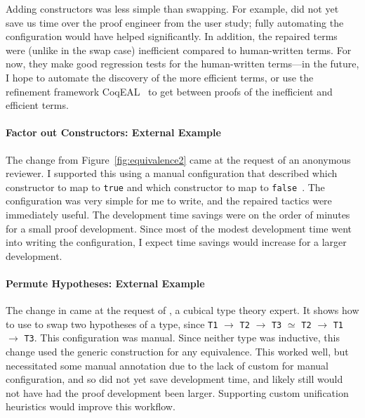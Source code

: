 Adding constructors was less simple than swapping.
For example, \toolnamec did not yet save us time over the proof engineer from the user study;
fully automating the configuration would have helped significantly.
In addition, the repaired terms were (unlike in the swap case) inefficient compared to human-written terms.
For now, they make good regression tests for the human-written terms---in the future,
I hope to automate the discovery of the more efficient terms,
or use the refinement framework CoqEAL~\cite{cohen:hal-01113453}
to get between proofs of the inefficient and efficient terms.

\paragraph{Factor out Constructors: External Example}
The change from Figure~\ref{fig:equivalence2} came at the request of an anonymous reviewer.
I supported this using a manual configuration that described which constructor to map to \lstinline{true}
and which constructor to map to \lstinline{false}~\href{https://github.com/uwplse/pumpkin-pi/blob/v2.0.0/plugin/coq/playground/constr_refactor.v}{}.
The configuration was very simple for me to write, and the repaired tactics were immediately useful.
The development time savings were on the order of minutes for a small proof development.
Since most of the modest development time went into writing the configuration,
I expect time savings would increase for a larger development.

\paragraph{Permute Hypotheses: External Example}
The change in \href{https://github.com/uwplse/pumpkin-pi/blob/v2.0.0/plugin/coq/playground/flip.v}{} came at the request of ,
a cubical type theory expert.
It shows how to use \toolnamec to swap two hypotheses of a type, since \lstinline{T1} $\rightarrow$ \lstinline{T2} $\rightarrow$ \lstinline{T3} $\simeq$
\lstinline{T2} $\rightarrow$ \lstinline{T1} $\rightarrow$ \lstinline{T3}.
This configuration was manual.
Since neither type was inductive, this change used the generic construction for any equivalence.
This worked well, but necessitated some manual annotation due to the lack of custom  for 
manual configuration, and so did not yet save development time, and likely still would not have had the proof development been larger.
Supporting custom unification heuristics would improve this workflow.

